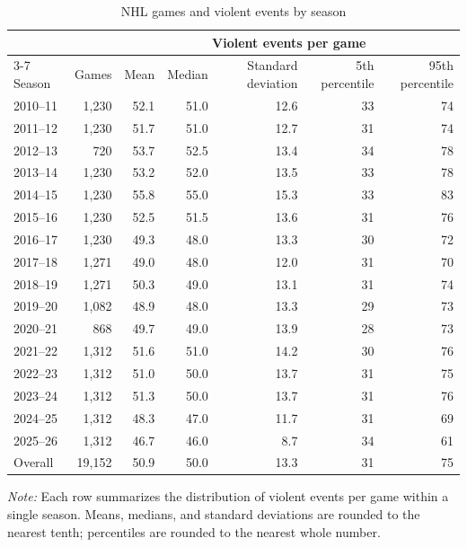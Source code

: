 \begin{table}[htbp]
\centering
\caption{NHL games and violent events by season}
\label{tab:season_summary}
\scriptsize
\renewcommand{\arraystretch}{1.12}
\setlength{\tabcolsep}{5pt}

\begin{tabular*}{\textwidth}{@{\extracolsep{\fill}}lrrrrrr}
\toprule
& & \multicolumn{5}{c}{Violent events per game} \\
\cmidrule(lr){3-7}
Season & Games & Mean & Median & Standard deviation & 5th percentile & 95th percentile \\
\midrule
2010--11 & 1,230 & 52.1 & 51.0 & 12.6 & 33 & 74 \\
2011--12 & 1,230 & 51.7 & 51.0 & 12.7 & 31 & 74 \\
2012--13 & 720 & 53.7 & 52.5 & 13.4 & 34 & 78 \\
2013--14 & 1,230 & 53.2 & 52.0 & 13.5 & 33 & 78 \\
2014--15 & 1,230 & 55.8 & 55.0 & 15.3 & 33 & 83 \\
2015--16 & 1,230 & 52.5 & 51.5 & 13.6 & 31 & 76 \\
2016--17 & 1,230 & 49.3 & 48.0 & 13.3 & 30 & 72 \\
2017--18 & 1,271 & 49.0 & 48.0 & 12.0 & 31 & 70 \\
2018--19 & 1,271 & 50.3 & 49.0 & 13.1 & 31 & 74 \\
2019--20 & 1,082 & 48.9 & 48.0 & 13.3 & 29 & 73 \\
2020--21 & 868 & 49.7 & 49.0 & 13.9 & 28 & 73 \\
2021--22 & 1,312 & 51.6 & 51.0 & 14.2 & 30 & 76 \\
2022--23 & 1,312 & 51.0 & 50.0 & 13.7 & 31 & 75 \\
2023--24 & 1,312 & 51.3 & 50.0 & 13.7 & 31 & 76 \\
2024--25 & 1,312 & 48.3 & 47.0 & 11.7 & 31 & 69 \\
2025--26 & 1,312 & 46.7 & 46.0 & 8.7 & 34 & 61 \\
\midrule
Overall & 19,152 & 50.9 & 50.0 & 13.3 & 31 & 75 \\
\bottomrule
\end{tabular*}

\vspace{0.4em}
\parbox{\textwidth}{
\footnotesize
\textit{Note:} Each row summarizes the distribution of violent events per game within a single season. Means, medians, and standard deviations are rounded to the nearest tenth; percentiles are rounded to the nearest whole number.
}
\end{table}
